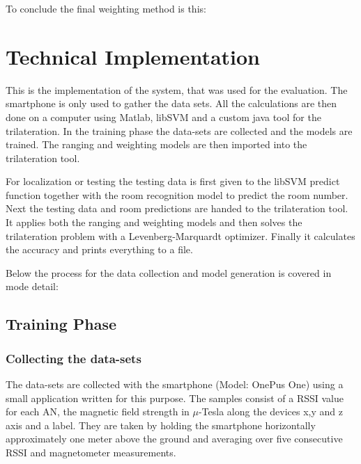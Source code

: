 
To conclude the final weighting method is this:


\section{Technical Implementation}
\label{technicalImplementation}

This is the implementation of the system, that was used for the evaluation. The smartphone is only used to gather the data sets. All the calculations are then done on a computer using Matlab, libSVM and a custom java tool for the trilateration. In the training phase the data-sets are collected and the models are trained. The ranging and weighting models are then imported into the trilateration tool.

For localization or testing the testing data is first given to the libSVM predict function together with the room recognition model to predict the room number. Next the testing data and room predictions are handed to the trilateration tool. It applies both the ranging and weighting models and then solves the trilateration problem with a Levenberg-Marquardt optimizer. Finally it calculates the accuracy and prints everything to a file.

Below the process for the data collection and model generation is covered in mode detail:

\subsection{Training Phase}
\subsubsection{Collecting the data-sets}

The data-sets are collected with the smartphone (Model: OnePus One) using a small application written for this purpose. The samples consist of a RSSI value for each AN, the magnetic field strength in \(\mu\)-Tesla along the devices x,y and z axis and a label. They are taken by holding the smartphone horizontally approximately one meter above the ground and averaging over five 
consecutive RSSI and magnetometer measurements.

